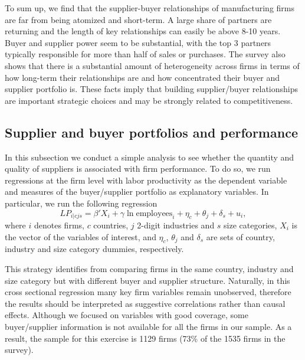 \usepackage{}\documentclass[final, dvipsnames, authoryear,12pt]{elsarticle}
\begin{document}
To sum up, we find that the supplier-buyer relationships of manufacturing firms are far from being atomized and short-term. A large share of partners are returning and the length of key relationships can easily be above 8-10 years. Buyer and supplier power seem to be substantial, with the top 3 partners typically responsible for more than half of sales or purchases. The survey also shows that there is a substantial amount of heterogeneity across firms in terms of how long-term their relationships are and how concentrated their buyer and supplier portfolio is. These facts imply that building supplier/buyer relationships are important strategic choices and may be strongly related to competitiveness.


\subsection{Supplier and buyer portfolios and performance}

In this subsection we conduct a simple analysis to see whether the quantity and quality of suppliers is associated with firm performance. To do so, we run regressions at the firm level with labor productivity as the dependent variable and measures of the buyer/supplier portfolio as explanatory variables. In particular, we run the following regression
%
\begin{equation}
    LP_{i|cjs}=\beta' X_{i}+\gamma \ln \text{employees}_i+\eta_c+\theta_j+\delta_s+u_i,
\end{equation}{}
%
where $i$ denotes firms, $c$ countries, $j$ 2-digit industries and $s$ size categories, $X_{i}$ is the vector of the variables of interest, and $\eta_c$, $\theta_j$ and $\delta_s$ are sets of country, industry and size category dummies, respectively. 



This strategy identifies from comparing firms in the same country, industry and size category but with different buyer and supplier structure. Naturally, in this cross sectional regression many key firm variables remain unobserved, therefore the results should be interpreted as suggestive correlations rather than causal effects. Although we focused on variables with good coverage, some buyer/supplier information is not available for all the firms in our sample. As a result, the sample for this exercise is 1129 firms (73\% of the 1535 firms in the survey). 
\end{document}
